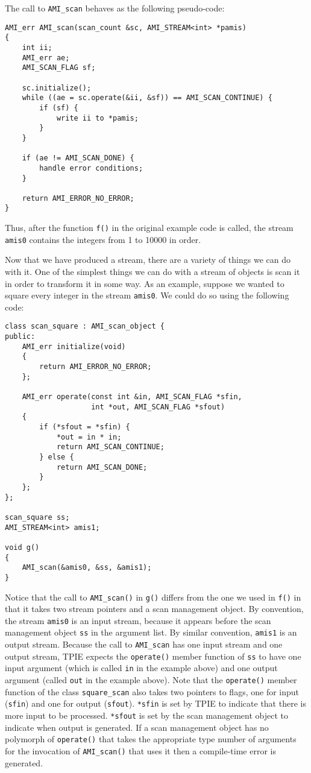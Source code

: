 The call to \verb|AMI_scan| behaves as the following pseudo-code:

\begin{verbatim} 
AMI_err AMI_scan(scan_count &sc, AMI_STREAM<int> *pamis)
{
    int ii;
    AMI_err ae;    
    AMI_SCAN_FLAG sf;

    sc.initialize();    
    while ((ae = sc.operate(&ii, &sf)) == AMI_SCAN_CONTINUE) {
        if (sf) {
            write ii to *pamis;
        }
    }

    if (ae != AMI_SCAN_DONE) {
        handle error conditions;
    }

    return AMI_ERROR_NO_ERROR;
}
\end{verbatim}

Thus, after the function \verb|f()| in the original example code is
called, the stream \verb|amis0| contains the integers from 1 to 10000
in order.

Now that we have produced a stream, there are a variety of things we
can do with it.  One of the simplest things we can do with a stream of
objects is scan it in order to transform it in some way.  As an
example, suppose we wanted to square every integer in the stream
\verb|amis0|.  We could do so using the following code:

\begin{verbatim}
class scan_square : AMI_scan_object {
public:
    AMI_err initialize(void)
    {
        return AMI_ERROR_NO_ERROR;
    };

    AMI_err operate(const int &in, AMI_SCAN_FLAG *sfin,
                    int *out, AMI_SCAN_FLAG *sfout)
    {
        if (*sfout = *sfin) {
            *out = in * in;
            return AMI_SCAN_CONTINUE;
        } else {
            return AMI_SCAN_DONE;
        }
    };
};

scan_square ss;
AMI_STREAM<int> amis1;    

void g() 
{
    AMI_scan(&amis0, &ss, &amis1);
}
\end{verbatim}

Notice that the call to \verb|AMI_scan()| in \verb|g()| differs from
the one we used in \verb|f()| in that it takes two stream pointers and
a scan management object.  By convention, the stream \verb|amis0| is
an input stream, because it appears before the scan management object
\verb|ss| in the argument list.  By similar convention, \verb|amis1|
is an output stream.  Because the call to \verb|AMI_scan| has one
input stream and one output stream, TPIE expects the \verb|operate()|
member function of \verb|ss| to have one input argument (which is
called \verb|in| in the example above) and one output argument (called
\verb|out| in the example above).  Note that the \verb|operate()|
member function of the class \verb|square_scan| also takes two
pointers to flags, one for input (\verb|sfin|) and one for output
(\verb|sfout|).  \verb|*sfin| is set by TPIE to indicate that there is
more input to be processed.  \verb|*sfout| is set by the scan
management object to indicate when output is generated.
If a scan management object has no polymorph of \verb|operate()| that
takes the appropriate type number of arguments for the invocation of
\verb|AMI_scan()| that uses it then a compile-time error is generated.


